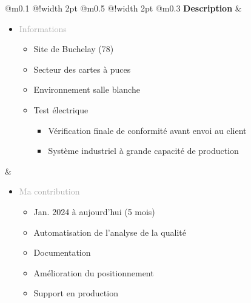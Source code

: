 \documentclass{article}
\begin{document}
\begin{tabular}
    {
        @{}m{}
        @{\hspace{0.001\textwidth}}!{\color{secondaryBlue}\vline width 2pt}
        @{}m{0.5\textwidth}
        @{\hspace{0.025\textwidth}}!{\color{secondaryBlue}\vline width 2pt}
        @{}m{0.3\textwidth}
    }
    \textcolor{secondaryBlue}{\textbf{Description}}           
    &
    \begin{itemize}[label={}, topsep=8pt, partopsep=0pt, itemsep=0.5pt, parsep=2pt, after=\vspace*{-\baselineskip}]
        \setlength{\itemsep}{10pt} 
        \item \textcolor{darkGray}{Informations}
        \begin{itemize}[label={\textcolor{gray!80}{\checkmark}}, topsep=8pt, partopsep=0pt, itemsep=0.5pt, parsep=2pt] 
            \item \textcolor{gray!80}{Site de Buchelay (78)}
            \item \textcolor{gray!80}{Secteur des cartes à puces}
            \item \textcolor{gray!80}{Environnement salle blanche}
            \item \textcolor{gray!80}{Test électrique}
            \begin{itemize}
                [label={\textcolor{gray!80}{$\triangleright$}}, topsep=0pt, partopsep=0pt, itemsep=0.5pt, parsep=2pt] 
                \item \textcolor{gray!80}{Vérification finale de conformité avant envoi au client}
                \item \textcolor{gray!80}{Système industriel à grande capacité de production}
            \end{itemize}
        \end{itemize}
    \end{itemize}
    &
    \begin{itemize}[label={}, topsep=8pt, partopsep=0pt, itemsep=0.5pt, parsep=2pt, after=\vspace*{-\baselineskip}]
        \setlength{\itemsep}{10pt} 
        \item \textcolor{darkGray}{Ma contribution}
        \begin{itemize}[label={\textcolor{gray!80}{\checkmark}}, topsep=8pt, partopsep=0pt, itemsep=0.5pt, parsep=2pt] 
            \item \textcolor{gray!80}{Jan. 2024 à aujourd'hui (5 mois)}
            \item \textcolor{gray!80}{Automatisation de l'analyse de la qualité}
            \item \textcolor{gray!80}{Documentation}
            \item \textcolor{gray!80}{Amélioration du positionnement}
            \item \textcolor{gray!80}{Support en production}
        \end{itemize}
    \end{itemize}
\end{tabular}
\end{document}

